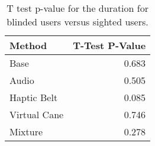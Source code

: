 
\begin{table}[!htb]
\centering
\caption{T test p-value for the duration for blinded users versus sighted users.}
\label{tab:ttest_duration}
\begin{tabular}{lr}
\toprule
      Method &  T-Test P-Value \\
\midrule
        Base &           0.683 \\
       Audio &           0.505 \\
 Haptic Belt &           0.085 \\
Virtual Cane &           0.746 \\
     Mixture &           0.278 \\
\bottomrule
\end{tabular}
\end{table}

